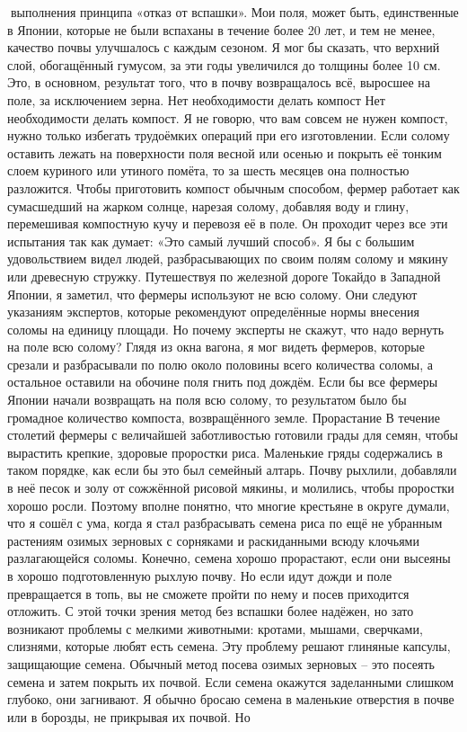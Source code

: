 \documentclass[a4paper]{book}
\begin{document}
выполнения принципа «отказ от вспашки». Мои поля, может быть, единственные в Японии,
которые не были вспаханы в течение более 20 лет, и тем не менее, качество почвы
улучшалось с каждым сезоном. Я мог бы сказать, что верхний слой, обогащённый гумусом,
за эти годы увеличился до толщины более 10 см. Это, в основном, результат того, что в почву
возвращалось всё, выросшее на поле, за исключением зерна.
Нет необходимости делать компост
Нет необходимости делать компост. Я не говорю, что вам совсем не нужен компост,
нужно только избегать трудоёмких операций при его изготовлении. Если солому оставить
лежать на поверхности поля весной или осенью и покрыть её тонким слоем куриного или
утиного помёта, то за шесть месяцев она полностью разложится.
Чтобы приготовить компост обычным способом, фермер работает как сумасшедший на
жарком солнце, нарезая солому, добавляя воду и глину, перемешивая компостную кучу и
перевозя её в поле. Он проходит через все эти испытания так как думает: «Это самый лучший
способ». Я бы с большим удовольствием видел людей, разбрасывающих по своим полям
солому и мякину или древесную стружку.
Путешествуя по железной дороге Токайдо в Западной Японии, я заметил, что фермеры
используют не всю солому. Они следуют указаниям экспертов, которые рекомендуют
определённые нормы внесения соломы на единицу площади. Но почему эксперты не скажут,
что надо вернуть на поле всю солому? Глядя из окна вагона, я мог видеть фермеров, которые
срезали и разбрасывали по полю около половины всего количества соломы, а остальное
оставили на обочине поля гнить под дождём.
Если бы все фермеры Японии начали возвращать на поля всю солому, то результатом
было бы громадное количество компоста, возвращённого земле.
Прорастание
В течение столетий фермеры с величайшей заботливостью готовили грады для семян,
чтобы вырастить крепкие, здоровые проростки риса. Маленькие гряды содержались в таком
порядке, как если бы это был семейный алтарь. Почву рыхлили, добавляли в неё песок и золу
от сожжённой рисовой мякины, и молились, чтобы проростки хорошо росли. Поэтому
вполне понятно, что многие крестьяне в округе думали, что я сошёл с ума, когда я стал
разбрасывать семена риса по ещё не убранным растениям озимых зерновых с сорняками и
раскиданными всюду клочьями разлагающейся соломы. Конечно, семена хорошо прорастают,
если они высеяны в хорошо подготовленную рыхлую почву. Но если идут дожди и поле
превращается в топь, вы не сможете пройти по нему и посев приходится отложить. С этой
точки зрения метод без вспашки более надёжен, но зато возникают проблемы с мелкими
животными: кротами, мышами, сверчками, слизнями, которые любят есть семена. Эту
проблему решают глиняные капсулы, защищающие семена.
Обычный метод посева озимых зерновых – это посеять семена и затем покрыть их
почвой. Если семена окажутся заделанными слишком глубоко, они загнивают. Я обычно
бросаю семена в маленькие отверстия в почве или в борозды, не прикрывая их почвой. Но
\end{document}
